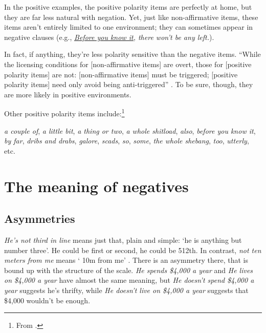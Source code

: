 In the positive examples, the positive polarity items are perfectly at home, but they are far less natural with negation. Yet, just like non-affirmative items, these items aren't entirely limited to one environment; they can sometimes appear in negative clauses (e.g., \textit{\uline{Before you know it,} there won't be any left.}).

In fact, if anything, they're less polarity sensitive than the negative items. ``While the licensing conditions for [non-affirmative items] are overt, those for [positive polarity items] are not: [non-affirmative items] must be triggered; [positive polarity items] need only avoid being anti-triggered'' \citep[28]{Israel2011}. To be sure, though, they are more likely in positive environments.

Other positive polarity items include:\footnote{From \citet[258--265]{Israel2011}.}

\ea \textit{a couple of}, \textit{a little bit}, \textit{a thing or two}, \textit{a whole shitload}, \textit{also}, \textit{before you know it}, \textit{by far}, \textit{dribs and drabs}, \textit{galore}, \textit{scads}, \textit{so}, \textit{some}, \textit{the whole shebang}, \textit{too}, \textit{utterly}, etc.
\z
{}

\section{The meaning of negatives} \label{sec:meaning-of-negatives}

\subsection{Asymmetries}
\textit{He's not third in line} means just that, plain and simple: `he is anything but number three'. He could be first or second, he could be 512th. In contrast, \textit{not ten meters from me} means ` 10m from me' \citep[81]{Jespersen1917}. There is an asymmetry there, that is bound up with the structure of the scale. \textit{He spends \$4,000 a year} and \textit{He lives on \$4,000 a year} have almost the same meaning, but \textit{He doesn't spend \$4,000 a year} suggests he's thrifty, while \textit{He doesn't live on \$4,000 a year} suggests that \$4,000 wouldn't be enough.

